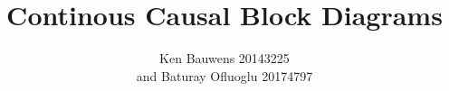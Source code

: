 \documentclass{article}
\title{\vspace{60mm}\textbf{Continous Causal Block Diagrams}}
\author{Ken Bauwens 20143225\\and Baturay Ofluoglu 20174797\\}
\begin{document}
\maketitle
\pagebreak
\end{document}

